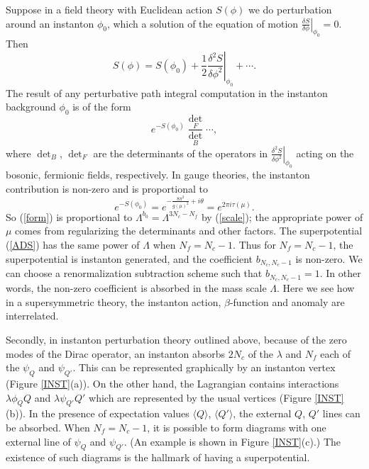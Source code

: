 \documentclass[lecture]{qft-l}
\newcommand{\del}{\delta}
\newcommand{\lam}{\lambda}
\newcommand{\tht}{\theta}
\newcommand{\Lam}{\varLambda}
\newcommand{\bra}{\langle}
\newcommand{\ket}{\rangle}
\newcommand{\inv}[1]{\frac{1}{#1}}
\newcommand{\e}[1]{e^{{#1}}}
\newcommand{\ii}{i}
\newcommand{\QT}{Q'}%
\numberwithin{figure}{chapter}
\begin{document}
Suppose in a field theory with Euclidean action $S(\phi)$ we do perturbation 
around an instanton $\phi_0$, which a solution of the equation of motion
$\left.\frac{\del S}{\del\phi}\right|_{\phi_0}=0$.
Then
\begin{equation}
S(\phi)=S(\phi_0)+
\left.\inv{2}\frac{\del^2S}{\del\phi^2}\right|_{\phi_0}+\cdots.
\end{equation}
The result of any perturbative path integral computation in the instanton
background $\phi_0$ is of the form
	\begin{equation}\label{form}
\e{-S(\phi_0)}\frac{\det_F}{\det_B}\cdots,
\end{equation}
where $\det_B$, $\det_F$ are the determinants of the operators in
$\left.\frac{\del^2S}{\del\phi^2}\right|_{\phi_0}$ acting on the bosonic,
fermionic fields, respectively.
In gauge theories, the instanton contribution is non-zero and 
is proportional to
\begin{equation}
\e{-S(\phi_0)}
=\e{-\frac{8\pi^2}{g(\mu)^2}+\ii\tht}=\e{2\pi\ii\tau(\mu)}.
\end{equation}
So (\ref{form}) is proportional to $\Lam^{b_0}=\Lam^{3N_c-N_f}$ by 
(\ref{scale}); the appropriate power of $\mu$ comes from regularizing the
determinants and other factors.
The superpotential (\ref{ADS}) has the same power of $\Lam$ when $N_f=N_c-1$.
Thus for $N_f=N_c-1$, the superpotential is instanton generated,
and the coefficient $b_{N_c,N_c-1}$ is non-zero.
We can choose a renormalization subtraction scheme such that $b_{N_c,N_c-1}=1$.
In other words, the non-zero coefficient is absorbed in the mass scale $\Lam$.
Here we see how in a supersymmetric theory, the instanton action,
$\beta$-function and anomaly are interrelated.

Secondly, in instanton perturbation theory outlined above, because of the
zero modes of the Dirac operator, an instanton absorbs $2N_c$ of the $\lam$
and $N_f$ each of the $\psi_Q$ and $\psi_{\QT}$.
This can be represented graphically by an instanton vertex 
(Figure \ref{INST}(a)).
On the other hand, the Lagrangian contains interactions $\lam\phi_QQ$ 
and $\lam\psi_{\QT}\QT$ which are represented by the usual vertices 
(Figure \ref{INST}(b)).
In the presence of expectation values $\bra Q\ket$, $\bra\QT\ket$,
the external $Q$, $\QT$ lines can be absorbed.
When $N_f=N_c-1$, it is possible to form diagrams with one external line
of $\psi_Q$ and $\psi_{\QT}$.
(An example is shown in Figure \ref{INST}(c).)
The existence of such diagrams is the hallmark of having a superpotential.
\end{document}

